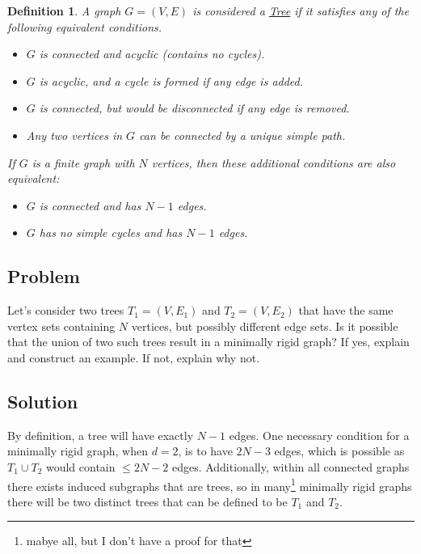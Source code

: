 \documentclass[]{article}
\numberwithin{equation}{section}
\newtheorem{definition}{Definition}
\begin{document}
\begin{definition} \label{def:tree_graph}
    A graph $G = (V, E)$ is considered a \emph{\underline{Tree}} if it satisfies any of the following equivalent conditions.
    \begin{itemize}
        \item $G$ is connected and acyclic (contains no cycles).
        \item $G$ is acyclic, and a cycle is formed if any edge is added.
        \item $G$ is connected, but would be disconnected if any edge is removed.
        \item Any two vertices in $G$ can be connected by a unique simple path.
    \end{itemize}
    If $G$ is a finite graph with $N$ vertices, then these additional conditions are also equivalent:
    \begin{itemize}
        \item $G$ is connected and has $N - 1$ edges.
        \item $G$ has no simple cycles and has $N-1$ edges.
    \end{itemize}
\end{definition}

\subsection*{Problem}
Let's consider two trees $T_1 = (V, E_1)$ and $T_2 = (V, E_2)$ that have the same vertex sets containing $N$ vertices, but possibly different edge sets. 
Is it possible that the union of two such trees result in a minimally rigid graph? 
If yes, explain and construct an example. 
If not, explain why not. 

\subsection*{Solution}
By definition, a tree will have exactly $N-1$ edges. 
One necessary condition for a minimally rigid graph, when $d=2$, is to have $2N-3$ edges, which is possible as $T_1 \cup T_2$ would contain $\leq 2N - 2$ edges.
Additionally, within all connected graphs there exists induced subgraphs that are trees, so in many\footnote{
    mabye all, but I don't have a proof for that
} minimally rigid graphs there will be two distinct trees that can be defined to be $T_1$ and $T_2$.
\end{document}
